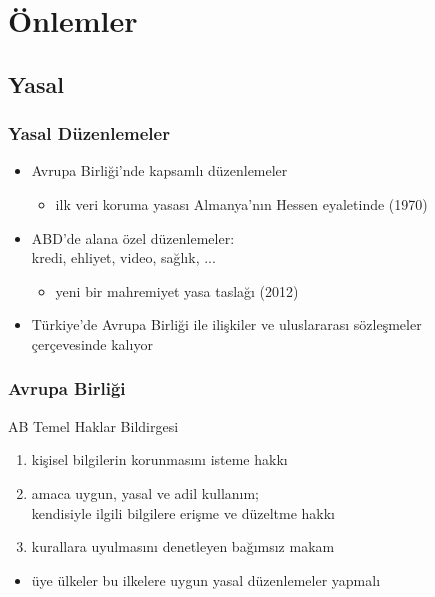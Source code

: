 \documentclass[dvipsnames]{beamer}
\theoremstyle{definition}
\theoremstyle{example}
\theoremstyle{plain}
\begin{document}
\section{Önlemler}

\subsection{Yasal}

\begin{frame}
  \frametitle{Yasal Düzenlemeler}

  \begin{itemize}
    \item Avrupa Birliği'nde kapsamlı düzenlemeler
    \begin{itemize}
      \item ilk veri koruma yasası Almanya'nın Hessen eyaletinde (1970)
    \end{itemize}

    \pause
    \item ABD'de alana özel düzenlemeler:\\
      kredi, ehliyet, video, sağlık, ...
    \begin{itemize}
      \item yeni bir mahremiyet yasa taslağı (2012)
    \end{itemize}

    \pause
    \item Türkiye'de Avrupa Birliği ile ilişkiler ve uluslararası sözleşmeler\\
      çerçevesinde kalıyor
  \end{itemize}
\end{frame}

\begin{frame}
  \frametitle{Avrupa Birliği}

  \begin{block}{AB Temel Haklar Bildirgesi}
    \begin{enumerate}
      \item kişisel bilgilerin korunmasını isteme hakkı
      \item amaca uygun, yasal ve adil kullanım;\\
        kendisiyle ilgili bilgilere erişme ve düzeltme hakkı
      \item kurallara uyulmasını denetleyen bağımsız makam
    \end{enumerate}
  \end{block}

  \begin{itemize}
    \item üye ülkeler bu ilkelere uygun yasal düzenlemeler yapmalı
  \end{itemize}
\end{frame}
\end{document}
